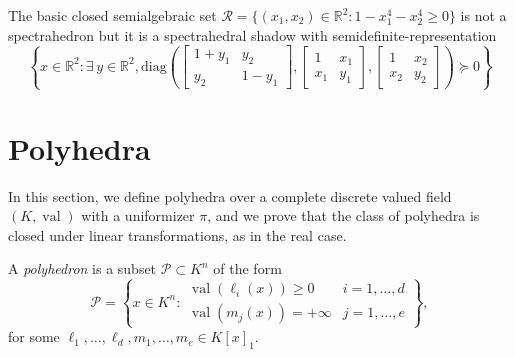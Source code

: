 \documentclass{elsarticle}
\theoremstyle{plain}
\theoremstyle{definition}
\newcommand{\R}{\mathbb{R}} %
\newcommand{\PP}{\mathcal{P}}
\DeclareMathOperator{\val}{val}
\def\diag{\mathrm{diag}}
\begin{document}
\begin{example}
\label{fermat_quartic}
The basic closed semialgebraic set $\mathcal{R} = \{(x_1,x_2) \in \R^2 : 1-x_1^4-x_2^4 \geq 0\}$ is not a spectrahedron but it is a spectrahedral shadow with semidefinite-representation
$$
\left\{x \in \R^2 :
\exists\, y \in \R^2,
\diag\left(
\left[
\begin{smallmatrix}
  1+y_1 & y_2 \\
  y_2 & 1-y_1
\end{smallmatrix}
\right],
\left[
\begin{smallmatrix}
  1 & x_1 \\
  x_1 & y_1
\end{smallmatrix}
\right],
\left[
\begin{smallmatrix}
  1 & x_2 \\
  x_2 & y_2
\end{smallmatrix}
\right]
\right)
\succeq 0
\right\}
$$
\end{example}


\section{Polyhedra}
\label{sec:polyhedra}

In this section, we define polyhedra over a complete discrete valued field $(K,\val)$
with a uniformizer $\pi$, and we prove that the class of polyhedra is closed under
linear transformations, as in the real case. 

\begin{definition}
  \label{def_polyhedra}
  A \emph{polyhedron} is a subset $\PP \subset K^n$ of the form
  \begin{equation}\label{eq_def_polyhedra}
  \PP =
  \left\{
  x \in K^n :
  \begin{array}{ll}
    \val(\ell_i(x)) \geq 0 & i=1,\ldots,d \\
    \val(m_j(x)) = +\infty & j=1,\ldots,e
  \end{array}
    \right\},
  \end{equation}
  for some $\ell_1,\ldots,\ell_d,m_1,\ldots,m_e \in K[x]_1$.
\end{definition}
\end{document}
